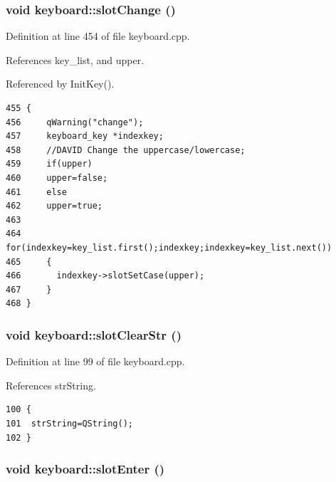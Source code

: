 \subsubsection{\setlength{\rightskip}{0pt plus 5cm}void keyboard::slot\-Change ()\hspace{0.3cm}{\tt  [slot]}}\label{classkeyboard_keyboardi5}




Definition at line 454 of file keyboard.cpp.

References key\_\-list, and upper.

Referenced by Init\-Key().



\footnotesize\begin{verbatim}455 {
456     qWarning("change");
457     keyboard_key *indexkey;
458     //DAVID Change the uppercase/lowercase;
459     if(upper)
460     upper=false;
461     else
462     upper=true;
463      
464     for(indexkey=key_list.first();indexkey;indexkey=key_list.next())
465     {
466       indexkey->slotSetCase(upper);
467     }
468 }
\end{verbatim}\normalsize 
{}
\subsubsection{\setlength{\rightskip}{0pt plus 5cm}void keyboard::slot\-Clear\-Str ()\hspace{0.3cm}{\tt  [slot]}}\label{classkeyboard_keyboardi2}




Definition at line 99 of file keyboard.cpp.

References str\-String.



\footnotesize\begin{verbatim}100 {
101  strString=QString();
102 }
\end{verbatim}\normalsize 
{}
\subsubsection{\setlength{\rightskip}{0pt plus 5cm}void keyboard::slot\-Enter ()\hspace{0.3cm}{\tt  [slot]}}\label{classkeyboard_keyboardi3}





